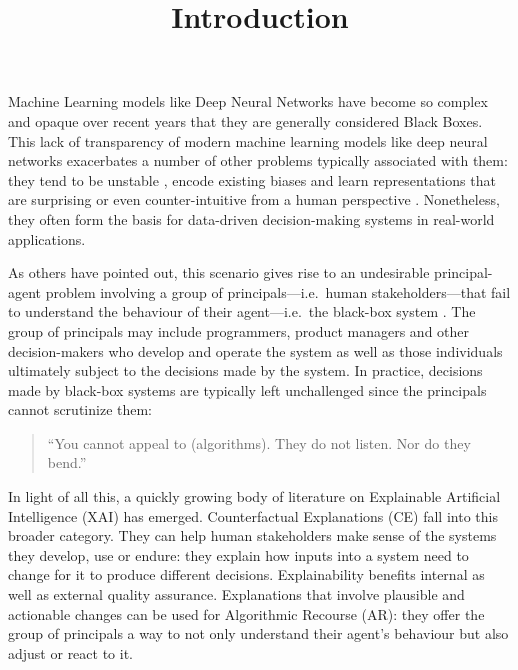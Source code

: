 \documentclass[
  letterpaper,
  DIV=11,
  numbers=noendperiod]{scrartcl}
\title{Introduction}
\author{}
\date{}
\begin{document}
\maketitle
\ifdefined\Shaded\renewenvironment{Shaded}{\begin{tcolorbox}[sharp corners, frame hidden, boxrule=0pt, borderline west={3pt}{0pt}{shadecolor}, interior hidden, enhanced, breakable]}{\end{tcolorbox}}\fi

Machine Learning models like Deep Neural Networks have become so complex
and opaque over recent years that they are generally considered Black
Boxes. This lack of transparency of modern machine learning models like
deep neural networks exacerbates a number of other problems typically
associated with them: they tend to be unstable
\cite{goodfellow2014explaining}, encode existing biases
\cite{buolamwini2018gender} and learn representations that are
surprising or even counter-intuitive from a human perspective
\cite{sturm2014simple}. Nonetheless, they often form the basis for
data-driven decision-making systems in real-world applications.

As others have pointed out, this scenario gives rise to an undesirable
principal-agent problem involving a group of principals---i.e.~human
stakeholders---that fail to understand the behaviour of their
agent---i.e.~the black-box system \cite{borch2022machine}. The group of
principals may include programmers, product managers and other
decision-makers who develop and operate the system as well as those
individuals ultimately subject to the decisions made by the system. In
practice, decisions made by black-box systems are typically left
unchallenged since the principals cannot scrutinize them:

\begin{quote}
``You cannot appeal to (algorithms). They do not listen. Nor do they
bend.'' \cite{oneil2016weapons}
\end{quote}

In light of all this, a quickly growing body of literature on
Explainable Artificial Intelligence (XAI) has emerged. Counterfactual
Explanations (CE) fall into this broader category. They can help human
stakeholders make sense of the systems they develop, use or endure: they
explain how inputs into a system need to change for it to produce
different decisions. Explainability benefits internal as well as
external quality assurance. Explanations that involve plausible and
actionable changes can be used for Algorithmic Recourse (AR): they offer
the group of principals a way to not only understand their agent's
behaviour but also adjust or react to it.
\end{document}
